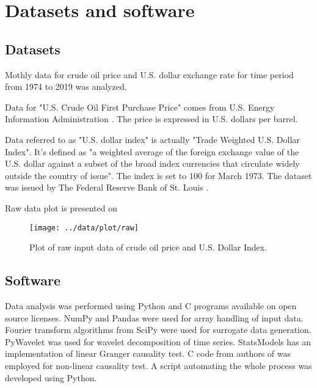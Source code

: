\section{Datasets and software} \label{sec:data}

\subsection{Datasets}

Mothly data for crude oil price and U.S. dollar exchange rate for time period from 1974 to 2019 was analyzed.

Data for "U.S. Crude Oil First Purchase Price" comes from U.S. Energy Information Administration \cite{crude-oil-data}. The price is expressed in U.S. dollars per barrel.

Data referred to as "U.S. dollar index" is actually "Trade Weighted U.S. Dollar Index".
It's defined as "a weighted average of the foreign exchange value of the U.S. dollar against a subset of the broad index currencies that circulate widely outside the country of issue".
The index is set to 100 for March 1973.
The dataset was issued by The Federal Reserve Bank of St. Louis \cite{usd-data}.

Raw data plot is presented on 

\begin{figure}[h]
	\texttt{[image: ../data/plot/raw]}
	\caption{Plot of raw input data of crude oil price and U.S. Dollar Index.}
	\label{fig:raw-data}
\end{figure}


\subsection{Software}
Data analysis was performed using Python and C programs available on open source licenses.
NumPy \cite{numpy} and Pandas \cite{reback2020pandas} were used for array handling of input data.
Fourier transform algorithms from SciPy \cite{scipy} were used for surrogate data generation.
PyWavelet \cite{pywavelet} was used for wavelet decomposition of time series.
StatsModels \cite{statsmodels} has an implementation of linear Granger causality test.
C code from authors of \cite{diks-panchenko2004} was employed for non-linear causality test.
A script automating the whole process was developed using Python.
